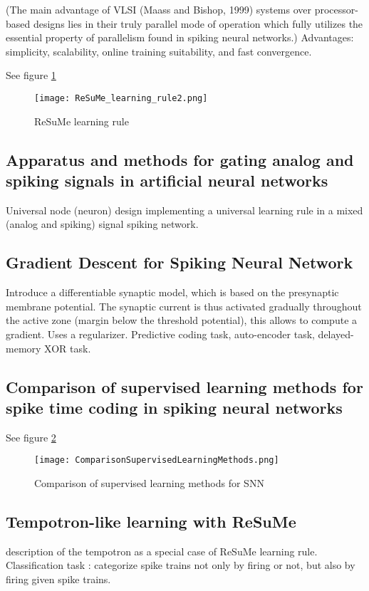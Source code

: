 \documentclass[12pt]{article}
\begin{document}
(The main advantage of VLSI (Maass and Bishop, 1999) systems over processor-based designs lies in their truly parallel mode of operation which fully utilizes the essential property of parallelism found in spiking neural networks.) Advantages: simplicity, scalability, online training suitability, and fast convergence.

See figure \ref{ReSuMe2}
\begin{figure}
\center
\texttt{[image: ReSuMe\_learning\_rule2.png]}
\caption{ReSuMe learning rule}
\label{ReSuMe2}
\end{figure}

\subsection{Apparatus and methods for gating analog and spiking signals in artificial neural networks \cite{ponulak2015apparatus}}

Universal node (neuron) design implementing a universal learning rule in a mixed (analog and spiking) signal spiking network.

\subsection{Gradient Descent for Spiking Neural Network \cite{huh2018gradient}}
Introduce a differentiable synaptic model, which is based on the presynaptic membrane potential. The synaptic current is thus activated gradually throughout the active zone (margin below the threshold potential), this allows to compute a gradient. Uses a regularizer.
Predictive coding task, auto-encoder task, delayed-memory XOR task.

\subsection{Comparison of supervised learning methods for spike time coding in spiking neural networks \cite{kasinski2006comparison}}
See figure \ref{comparisonSupLearn}
\begin{figure}
\center
\texttt{[image: ComparisonSupervisedLearningMethods.png]}
\caption{Comparison of supervised learning methods for SNN}
\label{comparisonSupLearn}
\end{figure}

\subsection{Tempotron-like learning with ReSuMe \cite{florian2008tempotron}}
description of the tempotron as a special case of ReSuMe learning rule. Classification task : categorize spike trains not only by firing or not, but also by firing given spike trains.
\end{document}
